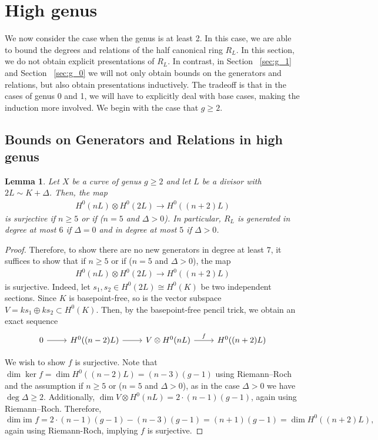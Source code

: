 \documentclass{amsart}
\theoremstyle{plain}
\newtheorem{lem}[thm]{Lemma}
\theoremstyle{definition}
\theoremstyle{remark}
\numberwithin{equation}{section}
\newcommand\ssec{\subsection}
\newcommand\im{\text{im }}
\begin{document}

\section{High genus}
\label{sec:g_high}
We now consider the case when the genus is at least 2. In this case, we are able to bound the degrees and relations of the half canonical ring $R_L$. In this section, we do not obtain explicit presentations of $R_L.$ In contrast, in Section ~\ref{sec:g_1} and Section ~\ref{sec:g_0} we will not only obtain bounds on the generators and relations, but also obtain presentations inductively. The tradeoff is that in the cases of genus 0 and 1, we will have to explicitly deal with base cases, making the induction more involved. We begin with the case that $g \geq 2$.

\ssec{Bounds on Generators and Relations in high genus}

\begin{lem}
\label{lem:semicanonical_generation}
Let $X$ be a curve of genus $g \geq 2$ and let $L$ be a divisor with $2 L \sim K + \Delta$. Then, the map
\begin{align*}
	H^0(nL) \otimes H^0(2L) \rightarrow H^0((n+2)L)
\end{align*}
is surjective if $n \geq 5$ or if ($n = 5$ and $\Delta > 0$).
In particular, $R_L$ is generated in degree at most $6$ if $\Delta = 0$ and in degree at most $5$ if $\Delta > 0$.
\end{lem}
\begin{proof}
Therefore, to show there are no new generators in degree at least $7$, it suffices to show that if $n \geq 5$ or if ($n = 5$ and $\Delta > 0$), the map
\begin{align*}
	H^0(nL) \otimes H^0(2L) \rightarrow H^0((n+2)L)
\end{align*}
is surjective. Indeed, let $s_1,s_2 \in H^0(2L) \cong H^0(K)$ be two independent sections. 
Since $K$ is basepoint-free, so is the vector subspace $V = ks_1 \oplus k s_2 \subset H^0(K)$. 
Then, by the basepoint-free pencil trick, we obtain an exact sequence
$$\begin{tikzcd}
0 \ar r & H^0((n-2)L) \ar r & V \otimes H^0(nL) \ar{r}{f} & H^0((n+2)L)
\end{tikzcd}$$


We wish to show $f$ is surjective.
Note that $\dim \ker f = \dim H^0((n-2)L) = (n-3)(g-1)$ using Riemann--Roch and the assumption if $n \geq 5$ or ($n = 5$ and $\Delta > 0$), as in the case $\Delta > 0$ we have $\deg \Delta \geq 2$.
Additionally, $\dim V \otimes H^0(nL) = 2 \cdot (n-1)(g-1)$, again using Riemann--Roch.
Therefore, $$\dim \im f = 2 \cdot (n-1)(g-1) -(n-3)(g-1) = (n+1)(g-1) = \dim H^0((n+2)L),$$
again using Riemann-Roch, implying $f$ is surjective.
\end{proof}
\end{document}
